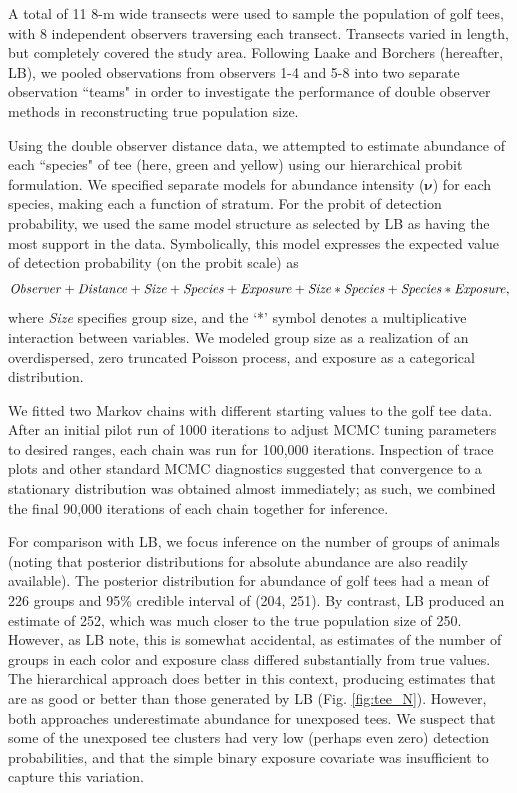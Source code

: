 \documentclass[10pt]{article}
\begin{document}
A total of 11 8-m wide transects were used to sample the population of golf tees, with 8 independent observers traversing each transect.  Transects varied in length, but completely covered the study area.  Following Laake and Borchers \cite{LaakeBorchers2004} (hereafter, LB), we pooled observations from observers 1-4 and 5-8 into two separate observation ``teams" in order to investigate the performance of double observer methods in reconstructing true population size.

Using the double observer distance data, we attempted to estimate abundance of each ``species" of tee (here, green and yellow) using our hierarchical probit formulation.  We specified separate models for abundance intensity ($\boldsymbol{\nu}$) for each species, making each a function of stratum. For the probit of detection probability, we used the same model structure as selected by LB as having the most support in the data.  Symbolically, this model expresses the expected value of detection probability (on the probit scale) as
$$
{\it Observer+Distance+Size+Species+Exposure+Size*Species+Species*Exposure},
$$
where {\it Size} specifies group size, and the `*' symbol denotes a multiplicative interaction between variables.  We modeled group size as a realization of an overdispersed, zero truncated Poisson process, and exposure as a categorical distribution.

We fitted two Markov chains with different starting values to the golf tee data.  After an initial pilot run of 1000 iterations to adjust MCMC tuning parameters to desired ranges, each chain was run for 100,000 iterations.  Inspection of trace plots and other standard MCMC diagnostics suggested that convergence to a stationary distribution was obtained almost immediately; as such, we combined the final 90,000 iterations of each chain together for inference.

For comparison with LB, we focus inference on the number of groups of animals (noting that posterior distributions for absolute abundance are also readily available).  The posterior distribution for abundance of golf tees had a mean of 226 groups and 95\% credible interval of (204, 251).  By contrast, LB produced an estimate of 252, which was much closer to the true population size of 250.  However, as LB note, this is somewhat accidental, as estimates of the number of groups in each
color and exposure class differed substantially from true values.  The hierarchical approach does better in this context, producing estimates that are as good or better than those generated by LB (Fig. \ref{fig:tee_N}).  However, both approaches underestimate abundance for unexposed tees.  We suspect that some of the unexposed tee clusters had very low (perhaps even zero) detection probabilities, and that the simple binary exposure covariate was insufficient to capture this variation.
\end{document}
